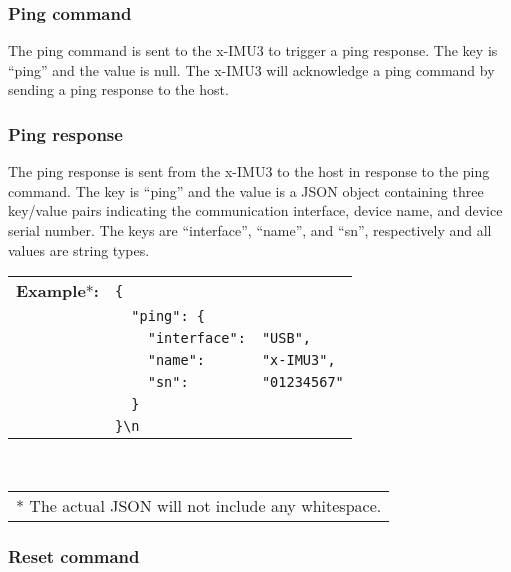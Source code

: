 
\subsubsection{Ping command}

The ping command is sent to the x-IMU3 to trigger a ping response.  The key is \enquote{ping} and the value is null.  The x-IMU3 will acknowledge a ping command by sending a ping response to the host.


\subsubsection{Ping response}

The ping response is sent from the x-IMU3 to the host in response to the ping command.  The key is \enquote{ping} and the value is a \ac{JSON} object containing three key/value pairs indicating the communication interface, device name, and device serial number.  The keys are \enquote{interface}, \enquote{name}, and \enquote{sn}, respectively and all values are string types.

\begin{table}[H]
    \begin{tabular}{l l l}
        \textbf{Example}*\textbf{:} & \texttt{\{}\\
        & \texttt{~~"ping":~\{} &\\
        & \texttt{~~~~"interface":} & \texttt{"USB",}\\
        & \texttt{~~~~"name":} & \texttt{"x-IMU3",}\\
        & \texttt{~~~~"sn":} & \texttt{"01234567"}\\
        & \texttt{~~\}}\\
        & \texttt{\}\textbackslash n}\\
    \end{tabular}\\
    \begin{tabular}{l}
        \\
        \footnotesize{* The actual \acs{JSON} will not include any whitespace.}
    \end{tabular}
\end{table}

\subsubsection{Reset command}

